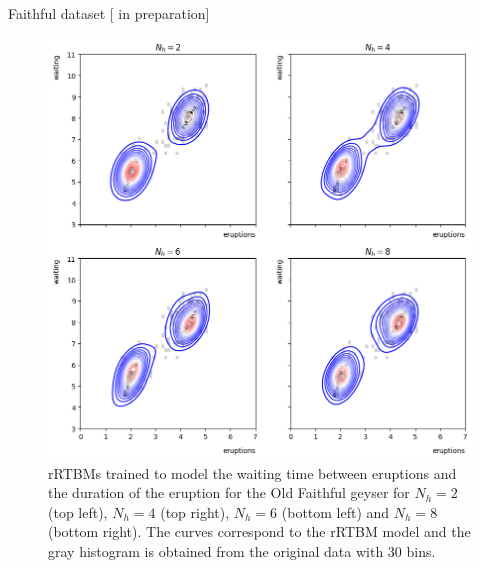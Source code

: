 \documentclass[10pt]{beamer}
\begin{document}
\begin{frame}{Faithful dataset \hfill \small [\cite{new} in preparation]}

    \begin{figure}
        \includegraphics[height= 0.8 \textheight]{figures/faithful.png}
       
            \caption{\scriptsize rRTBMs trained to model the waiting time between eruptions and the duration of the eruption for the Old Faithful geyser for $N_h = 2$ (top left), $N_h = 4$ (top right), $N_h = 6$ (bottom left) and $N_h = 8$ (bottom right).
            The curves correspond to the rRTBM model and the gray histogram is obtained from the original data with 30 bins.}
    \end{figure}
    
    
\end{frame}
\end{document}
